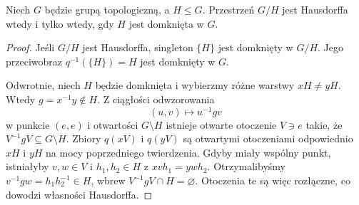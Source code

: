 \begin{twierdzenie}
\label{thm:topog24-coset-hausdorff}
Niech \(G\) będzie grupą topologiczną,
a \(H\le G\).
Przestrzeń \(G/H\) jest Hausdorffa
wtedy i tylko wtedy, gdy \(H\)
jest domknięta w \(G\).
\end{twierdzenie}
\begin{proof}
Jeśli \(G/H\) jest Hausdorffa,
singleton \(\{H\}\) jest domknięty
w \(G/H\). Jego przeciwobraz
\(q^{-1}(\{H\})=H\)
jest domknięty w \(G\).

Odwrotnie, niech \(H\) będzie domknięta
i wybierzmy różne warstwy
\(xH\neq yH\). Wtedy
\(g=x^{-1}y\notin H\).
Z ciągłości odwzorowania
\[
 (u,v)\longmapsto u^{-1}gv
\]
w punkcie \((e,e)\)
i otwartości \(G\setminus H\)
istnieje otwarte otoczenie \(V\ni e\)
takie, że
\(V^{-1}gV\subseteq G\setminus H\).
Zbiory \(q(xV)\) i \(q(yV)\)
są otwartymi otoczeniami
odpowiednio \(xH\) i \(yH\)
na mocy poprzedniego twierdzenia.
Gdyby miały wspólny punkt,
istniałyby \(v,w\in V\)
i \(h_1,h_2\in H\) z
\(xvh_1=ywh_2\).
Otrzymalibyśmy
\(v^{-1}gw=h_1h_2^{-1}\in H\),
wbrew \(V^{-1}gV\cap H=\varnothing\).
Otoczenia te są więc rozłączne,
co dowodzi własności Hausdorffa.
\end{proof}

